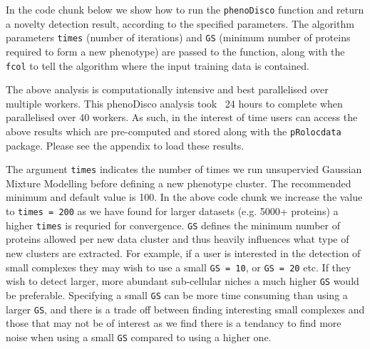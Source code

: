 In the code chunk below we show how to run the \texttt{phenoDisco}
function and return a novelty detection result, according to the
specified parameters. The algorithm parameters \texttt{times} (number
of iterations) and \texttt{GS} (minimum number of proteins required to
form a new phenotype) are passed to the function, along with the
\texttt{fcol} to tell the algorithm where the input training data is
contained.

\begin{knitrout}
\color{fgcolor}\begin{kframe}
\begin{alltt}
 \hlkwb{<-}   \hlstd{=} \hlstd{,}  \hlstd{=} \hlstd{,}  \hlstd{=} \hlstd{)}
\end{alltt}
\end{kframe}
\end{knitrout}

The above analysis is computationally intensive and best parallelised over
multiple workers. This phenoDisco analysis took ~24 hours to complete
when parallelised over 40 workers. As such, in the interest of time
users can access the above results which are
pre-computed and stored along with the \texttt{pRolocdata} package.
Please see the appendix to load these results.

The argument \texttt{times} indicates the number of times we run
unsupervied Gaussian Mixture Modelling before defining a new phenotype
cluster.  The recommended minimum and default value is 100. In the
above code chunk we increase the value to \texttt{times = 200} as we
have found for larger datasets (e.g. 5000+ proteins) a higher
\texttt{times} is requried for convergence. \texttt{GS} defines the
minimum number of proteins allowed per new data cluster and thus
heavily influences what type of new clusters are extracted. For
example, if a user is interested in the detection of small complexes
they may wish to use a small \texttt{GS = 10}, or \texttt{GS = 20} etc.
If they wish to detect larger, more abundant sub-cellular niches a
much higher \texttt{GS} would be preferable. Specifying a small
\texttt{GS} can be more time consuming than using a larger
\texttt{GS}, and there is a trade off between finding interesting
small complexes and those that may not be of interest as we find there
is a tendancy to find more noise when using a small \texttt{GS}
compared to using a higher one.

